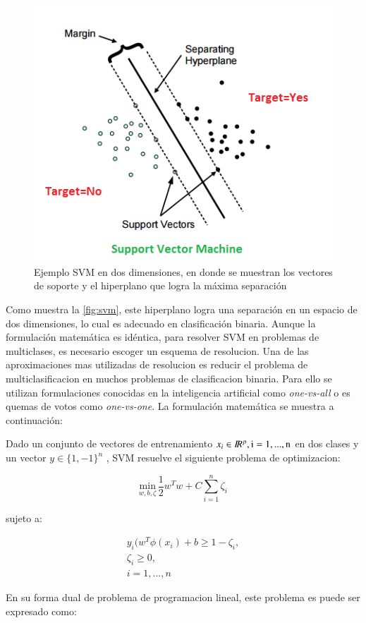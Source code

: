 \begin{figure}[ht!]
\centering
\includegraphics[width=.6\textwidth]{figures/SVM-Planes.png}
\caption[abs]{Ejemplo SVM en dos dimensiones, en donde se muestran los vectores de soporte y el hiperplano que logra la máxima separación}
\label{fig:svm}
\end{figure}

Como muestra la \autoref{fig:svm}, este hiperplano logra una separación en un espacio de dos dimensiones, lo cual es adecuado en clasificación binaria. Aunque la formulación matemática es idéntica, para resolver SVM en problemas de multiclases, es necesario escoger un esquema de resolucion. Una de las aproximaciones mas utilizadas de resolucion es reducir el problema de multiclasificacion en muchos problemas de clasificacion binaria. Para ello se utilizan formulaciones conocidas en la inteligencia artificial como \textit{one-vs-all} o es quemas de votos como \textit{one-vs-one}. La formulación matemática se muestra a continuación:

Dado un conjunto de vectores de entrenamiento $x_{i} \in I\!R ^{p}, \rm i = 1, ..., n$ en dos clases y un vector $ y  \in \{1, -1\}^{n}$ , SVM resuelve el siguiente problema de optimizacion:

$$ \underset{w, b, \zeta}{\mathrm{min}} \, \frac{1}{2} w^{T}w + C
\sum_{i=1}^{n} \zeta_{i}$$

sujeto a: 

\begin{align}
y_{i} ( w^{T} \phi(x_{i}) + b \geq  1 - \zeta_{i}, \\ 
\zeta_{i} \geq 0, \\
i = 1, ... , n
\end{align} 

En su forma dual de problema de programacion lineal, este problema es puede ser expresado como:

